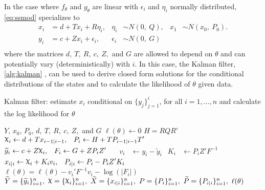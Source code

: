 \documentclass[12pt]{article}
\DeclareRobustCommand{\varx}{{\mathpalette\irchi\relax}}
\newcommand{\irchi}[2]{\protect\raisebox{\depth}{$#1\upchi$}}
\begin{document}
In the case where $f_\theta$ and $g_\theta$ are linear with $\epsilon_i$ and
$\eta_i$ normally distributed, \eqref{eq:ssmod} specializes to
\begin{equation}
  \begin{aligned}
    x_{i}&= d+T x_i + R\eta_{i}, 
    & \eta_i &\sim N(0,\ Q),     
    &x_1 &\sim N(x_0,\ P_0).\\
    y_i&= c + Z x_i + \epsilon_i,     
    & \epsilon_i &\sim N(0,\ G) \\
  \end{aligned}
  \label{eq:lgmod}
\end{equation}
where the matrices $d,\ T,\ R,\ c,\ Z,$ and $G$ are allowed to depend
on $\theta$ and can potentially vary (deterministically) with $i$. In this case,
the Kalman filter, \autoref{alg:kalman} \citep[see e.g.][]{Kalman1960,Harvey1990},
can be used to derive closed form 
solutions for the conditional
distributions of the states and to calculate the likelihood of $\theta$
given data. 
\begin{algorithm}[t!]
  \begin{singlespace}
  \caption{Kalman filter: estimate $x_i$ conditional on
    $\{y_j\}_{j=1}^i$, for all $i=1,\ldots,n$ and calculate the log likelihood
    for $\theta$\label{alg:kalman}}
  \begin{algorithmic}
     $Y$, $x_0$, $P_0$, $d,\ T,\ R,\ c,\ Z,$ and $G$
    \STATE $\ell(\theta) \leftarrow 0$ 
    \STATE $H = RQR'$ 
    \STATE $\begin{aligned}\varx_{i}
      &\leftarrow d + T x_{i-1|i-1}, & P_i &\leftarrow H + T P_{i-1|i-1}
      T'\end{aligned}$ 
    \STATE $\begin{aligned}\widetilde{y}_i
      &\leftarrow c + Z \varx_i, & F_i &\leftarrow G + Z P_i
      Z'\end{aligned}$ 
    \STATE $\begin{aligned}v_i&\leftarrow y_i-\widetilde{y}_i& K_i&
      \leftarrow P_i Z' F^{-1}\end{aligned}$ 
    \STATE $\begin{aligned} x_{i|i}
      &\leftarrow \varx_i + K_i v_i, & P_{i|i} &\leftarrow P_i - P_iZ'
      K_i\end{aligned}$ 
    \STATE $\ell(\theta) = \ell(\theta) -v_i'F^{-1}v_i - \log(|F_i|)$
    \ENDFOR
    \RETURN $\widetilde{Y}=\{\widetilde{y}_i\}_{i=1}^n,\ \varx=\{\varx_i\}_{i=1}^n,\
    \widetilde{X}=\{x_{i|i}\}_{i=1}^n,\ P=\{P_i\}_{i=1}^n,\
    \widetilde{P}=\{P_{i|i}\}_{i=1}^n,\ \ell(\theta)$
  \end{algorithmic}
\end{singlespace}
\end{algorithm}
\end{document}
